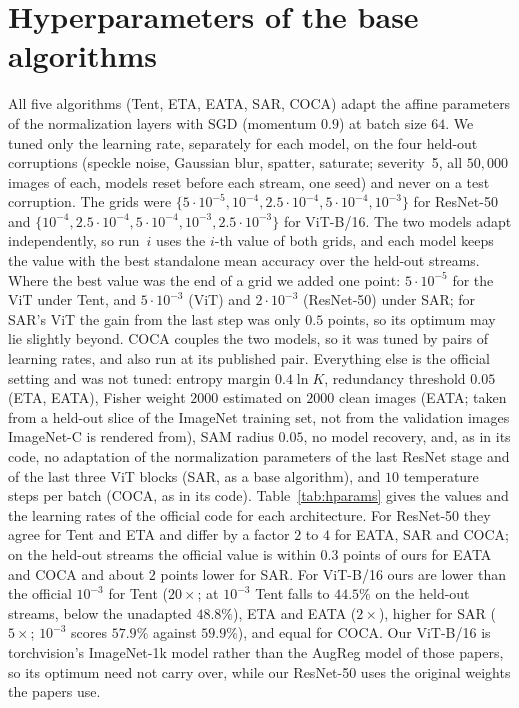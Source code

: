 \section{Hyperparameters of the base algorithms}\label{app:hparams}

All five algorithms (Tent, ETA, EATA, SAR, COCA) adapt the affine parameters of the normalization layers with SGD (momentum $0.9$) at batch size $64$.
We tuned only the learning rate, separately for each model, on the four held-out corruptions (speckle noise, Gaussian blur, spatter, saturate; severity~5,
all $50{,}000$ images of each, models reset before each stream, one seed) and never on a test corruption.
The grids were $\{5{\cdot}10^{-5}, 10^{-4}, 2.5{\cdot}10^{-4}, 5{\cdot}10^{-4}, 10^{-3}\}$ for ResNet-50 and $\{10^{-4}, 2.5{\cdot}10^{-4}, 5{\cdot}10^{-4}, 10^{-3}, 2.5{\cdot}10^{-3}\}$ for ViT-B/16.
The two models adapt independently, so run~$i$ uses the $i$-th value of both grids, and each model keeps the value with the best standalone mean accuracy over the held-out streams.
Where the best value was the end of a grid we added one point: $5{\cdot}10^{-5}$ for the ViT under Tent, and $5{\cdot}10^{-3}$ (ViT) and $2{\cdot}10^{-3}$ (ResNet-50) under SAR; for SAR's ViT the gain from the last step was only $0.5$ points, so its optimum may lie slightly beyond.
COCA couples the two models, so it was tuned by pairs of learning rates, and also run at its published pair.
Everything else is the official setting and was not tuned: entropy margin $0.4\ln K$, redundancy threshold $0.05$ (ETA, EATA), Fisher weight $2000$ estimated on $2000$ clean images (EATA; taken from a held-out slice of the ImageNet training set, not from the validation images ImageNet-C is rendered from), SAM radius $0.05$, no model recovery, and, as in its code, no adaptation of the normalization parameters of the last ResNet stage and of the last three ViT blocks (SAR, as a base algorithm), and $10$ temperature steps per batch (COCA, as in its code).
Table~\ref{tab:hparams} gives the values and the learning rates of the official code for each architecture.
For ResNet-50 they agree for Tent and ETA and differ by a factor $2$ to $4$ for EATA, SAR and COCA; on the held-out streams the official value is within $0.3$ points of ours for EATA and COCA and about $2$ points lower for SAR.
For ViT-B/16 ours are lower than the official $10^{-3}$ for Tent ($20\times$; at $10^{-3}$ Tent falls to $44.5\%$ on the held-out streams, below the unadapted $48.8\%$), ETA and EATA ($2\times$), higher for SAR ($5\times$; $10^{-3}$ scores $57.9\%$ against $59.9\%$), and equal for COCA.
Our ViT-B/16 is torchvision's ImageNet-1k model rather than the AugReg model of those papers, so its optimum need not carry over, while our ResNet-50 uses the original weights the papers use.

